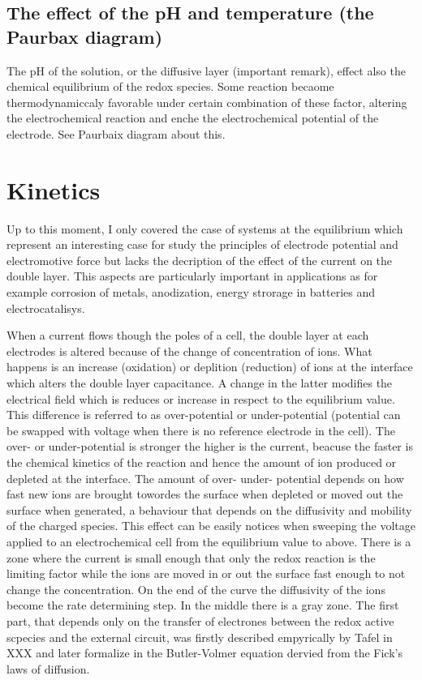 \subsection{The effect of the pH and temperature (the Paurbax diagram)}

The pH of the solution, or the diffusive layer (important remark), effect also the chemical equilibrium of the redox species. Some reaction becaome thermodynamiccaly favorable under certain combination of these factor, altering the electrochemical reaction and enche the electrochemical potential of the electrode. See Paurbaix diagram about this.

\section{Kinetics}

Up to this moment, I only covered the case of systems at the equilibrium which represent an interesting case for study the principles of electrode potential and electromotive force but lacks the decription of the effect of the current on the double layer. This aspects are particularly important in applications as for example corrosion of metals, anodization, energy strorage in batteries and electrocatalisys.

When a current flows though the poles of a cell, the double layer at each electrodes is altered because of the change of concentration of ions. What happens is an increase (oxidation) or deplition (reduction) of ions at the interface which alters the double layer capacitance. A change in the latter modifies the electrical field which is reduces or increase in respect to the equilibrium value. This difference is referred to as over-potential or under-potential (potential can be swapped with voltage when there is no reference electrode in the cell). The over- or under-potential is stronger the higher is the current, beacuse the faster is the chemical kinetics of the reaction and hence the amount of ion produced or depleted at the interface. The amount of over- under- potential depends on how fast new ions are brought towordes the surface when depleted or moved out the surface when generated, a behaviour that depends on the diffusivity and mobility of the charged species. This effect can be easily notices when sweeping the voltage applied to an electrochemical cell from the equilibrium value to above. There is a zone where the current is small enough that only the redox reaction is the limiting factor while the ions are moved in or out the surface fast enough to not change the concentration. On the end of the curve the diffusivity of the ions become the rate determining step. In the middle there is a gray zone.
The first part, that depends only on the transfer of electrones between the redox active scpecies and the external circuit, was firstly described empyrically by Tafel in XXX and later formalize in the Butler-Volmer equation dervied from the Fick's laws of diffusion. 

